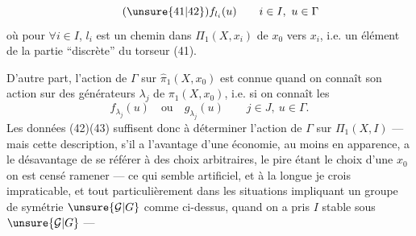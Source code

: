 \[
\tag{\unsure{41|42}}f_{l_i}(u)\qquad i\in I,\ u\in\Gamma
\]
où pour $\forall i\in I$, $l_i$ est un chemin dans $\Pi_1(X,x_i)$ de $x_0$ vers $x_i$, i.e. un élément de la partie ``discrète'' du torseur (41).

D'autre part, l'action de $\Gamma$ sur $\widehat\pi_1(X,x_0)$ est connue quand on connaît son action sur des générateurs $\lambda_j$  de $\pi_1(X,x_0)$, i.e. si on connaît les
\[
\tag{43}f_{\lambda_j}(u)\quad\text{ou}\quad g_{\lambda_j}(u)\qquad j\in J,\ u\in\Gamma.
\]
 Les données (42)(43) suffisent donc à déterminer l'action de $\Gamma$ sur $\Pi_1(X,I)$ --- mais cette description,   s'il a l'avantage d'une économie, au moins en apparence, a le désavantage de se référer à des choix arbitraires, le pire étant le choix d'une   $x_0$   on est censé  ramener --- ce qui semble artificiel, et à la longue je crois impraticable,  et tout particulièrement dans les situations impliquant un groupe de symétrie $\unsure{\mathcal G|G}$ comme ci-dessus, quand on a pris $I$ stable sous $\unsure{\mathcal G|G}$ ---
